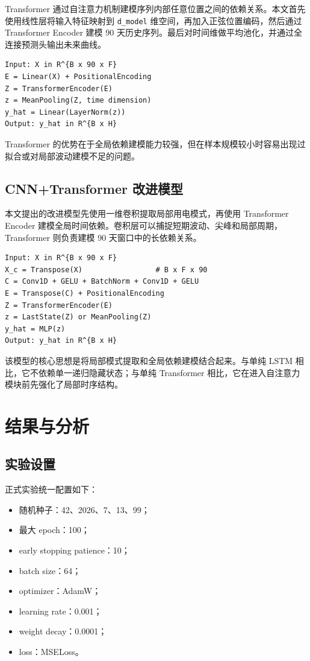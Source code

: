 \documentclass[UTF8,a4paper,12pt]{ctexart}
\begin{document}
Transformer 通过自注意力机制建模序列内部任意位置之间的依赖关系。本文首先使用线性层将输入特征映射到 \texttt{d\_model} 维空间，再加入正弦位置编码，然后通过 Transformer Encoder 建模 90 天历史序列。最后对时间维做平均池化，并通过全连接预测头输出未来曲线。

\begin{verbatim}
Input: X in R^{B x 90 x F}
E = Linear(X) + PositionalEncoding
Z = TransformerEncoder(E)
z = MeanPooling(Z, time dimension)
y_hat = Linear(LayerNorm(z))
Output: y_hat in R^{B x H}
\end{verbatim}

Transformer 的优势在于全局依赖建模能力较强，但在样本规模较小时容易出现过拟合或对局部波动建模不足的问题。

\subsection{CNN+Transformer 改进模型}

本文提出的改进模型先使用一维卷积提取局部用电模式，再使用 Transformer Encoder 建模全局时间依赖。卷积层可以捕捉短期波动、尖峰和局部周期，Transformer 则负责建模 90 天窗口中的长依赖关系。

\begin{verbatim}
Input: X in R^{B x 90 x F}
X_c = Transpose(X)                 # B x F x 90
C = Conv1D + GELU + BatchNorm + Conv1D + GELU
E = Transpose(C) + PositionalEncoding
Z = TransformerEncoder(E)
z = LastState(Z) or MeanPooling(Z)
y_hat = MLP(z)
Output: y_hat in R^{B x H}
\end{verbatim}

该模型的核心思想是将局部模式提取和全局依赖建模结合起来。与单纯 LSTM 相比，它不依赖单一递归隐藏状态；与单纯 Transformer 相比，它在进入自注意力模块前先强化了局部时序结构。

\section{结果与分析}

\subsection*{实验设置}

正式实验统一配置如下：

\begin{itemize}
  \item 随机种子：42、2026、7、13、99；
  \item 最大 epoch：100；
  \item early stopping patience：10；
  \item batch size：64；
  \item optimizer：AdamW；
  \item learning rate：0.001；
  \item weight decay：0.0001；
  \item loss：MSELoss。
\end{itemize}
\end{document}
